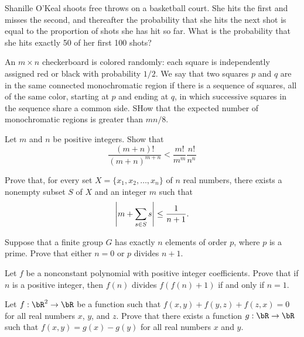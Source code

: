 \documentclass[12pt]{article}
\begin{document}
    \begin{exercise}[2002 B1]
        Shanille O'Keal shoots free throws on a basketball court.
        She hits the first and misses the second, and thereafter the probability that she hits the next shot is equal to the proportion of shots she has hit so far.
        What is the probability that she hits exactly 50 of her first 100 shots?
    \end{exercise}

    \begin{exercise}[2004 A5]
        An \(m\times n\) checkerboard is colored randomly: each square is independently assigned red or black with probability \(1/2\).
        We say that two squares \(p\) and \(q\) are in the same connected monochromatic region if there is a sequence of squares, all of the same color, starting at \(p\) and ending at \(q\), in which successive squares in the sequence share a common side.
        SHow that the expected number of monochromatic regions is greater than \(mn/8\).
    \end{exercise}

    \begin{exercise}[2004 B2]
        Let \(m\) and \(n\) be positive integers.
        Show that
        \[\frac{(m+n)!}{(m+n)^{m+n}}<\frac{m!}{m^m}\frac{n!}{n^n}\]
    \end{exercise}

    \begin{exercise}[2006 B2]
        Prove that, for every set \(X=\{x_1,x_2,\ldots,x_n\}\) of \(n\) real numbers, there exists a nonempty subset \(S\) of \(X\) and an integer \(m\) such that
        \[\left\lvert m+\sum_{s\in S}s \right\rvert\leq \frac{1}{n+1}.\]
    \end{exercise}

    \begin{exercise}[2007 A5]
        Suppose that a finite group $G$ has exactly $n$ elements of order $p$, where $p$ is a prime. Prove that either $n=0$ or $p$ divides $n+1$. 
    \end{exercise}

    \begin{exercise}[2007 B1]
        Let $f$ be a nonconstant polynomial with positive integer coefficients. Prove that if $n$ is a positive integer, then $f(n)$ divides $f(f(n)+1)$ if and only if $n=1$.
    \end{exercise}
    
    \begin{exercise}[2008 A1]
        Let \(f:\bR^2\to\bR\) be a function such that \(f(x,y)+f(y,z)+f(z,x)=0\) for all real numbers \(x\), \(y\), and \(z\).
        Prove that there exists a function \(g:\bR\to\bR\) such that \(f(x,y)=g(x)-g(y)\) for all real numbers \(x\) and \(y\).
    \end{exercise}
\end{document}
